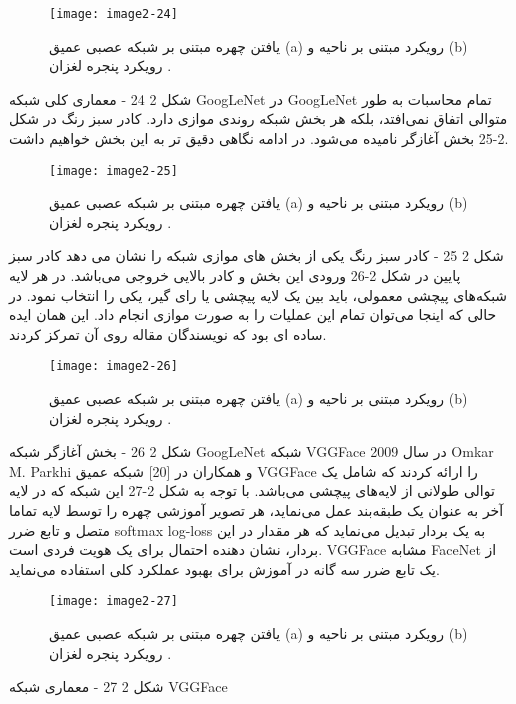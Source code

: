  \begin{figure}[h]
\centering
  \texttt{[image: image2-24]}
  \caption{یافتن چهره مبتنی بر شبکه عصبی عمیق (a) رویکرد مبتنی بر ناحیه و (b) رویکرد پنجره لغزان \cite{ref1}.}
  \label{image2-24}
\end{figure}

شکل ‏2 24 - معماری کلی شبکه GoogLeNet
در GoogLeNet تمام محاسبات به طور متوالی اتفاق نمی‌افتد، بلکه هر بخش شبکه روندی موازی دارد. کادر سبز رنگ در شکل 2-25 بخش آغازگر نامیده می‌شود. در ادامه نگاهی دقیق تر به این بخش خواهیم داشت.
 
 \begin{figure}[h]
\centering
  \texttt{[image: image2-25]}
  \caption{یافتن چهره مبتنی بر شبکه عصبی عمیق (a) رویکرد مبتنی بر ناحیه و (b) رویکرد پنجره لغزان \cite{ref1}.}
  \label{image2-25}
\end{figure}

شکل ‏2 25 -  کادر سبز رنگ یکی از بخش های موازی شبکه را نشان می دهد
کادر سبز پایین در شکل 2-26 ورودی این بخش و کادر بالایی خروجی می‌باشد. در هر لایه شبکه‌های پیچشی معمولی، باید بین یک لایه پیچشی یا رای گیر، یکی را انتخاب نمود. در حالی که اینجا می‌توان تمام این عملیات را به صورت موازی انجام داد. این همان ایده ساده ای بود که نویسندگان مقاله روی آن تمرکز کردند.
 
 \begin{figure}[h]
\centering
  \texttt{[image: image2-26]}
  \caption{یافتن چهره مبتنی بر شبکه عصبی عمیق (a) رویکرد مبتنی بر ناحیه و (b) رویکرد پنجره لغزان \cite{ref1}.}
  \label{image2-26}
\end{figure}

شکل ‏2 26 - بخش آغازگر شبکه GoogLeNet
	شبکه VGGFace
در سال 2009 Omkar M. Parkhi و همکاران در [20] شبکه عمیق VGGFace را ارائه کردند که شامل یک توالی طولانی از لایه‌های پیچشی می‌باشد. با توجه به شکل 2-27 این شبکه که در لایه آخر به عنوان یک طبقه‌بند عمل می‌نماید، هر تصویر آموزشی چهره را توسط لایه تماما متصل و تابع ضرر softmax log-loss به یک بردار تبدیل می‌نماید که هر مقدار در این بردار، نشان دهنده احتمال برای یک هویت فردی است. VGGFace مشابه FaceNet از یک تابع ضرر سه گانه  در آموزش برای بهبود عملکرد کلی استفاده می‌نماید.
 
 \begin{figure}[h]
\centering
  \texttt{[image: image2-27]}
  \caption{یافتن چهره مبتنی بر شبکه عصبی عمیق (a) رویکرد مبتنی بر ناحیه و (b) رویکرد پنجره لغزان \cite{ref1}.}
  \label{image2-27}
\end{figure}

شکل ‏2 27 - معماری شبکه VGGFace
